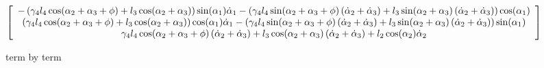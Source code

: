\documentclass{article}
\begin{document}
$\left[ 
\begin{array}{c}
-\left( \gamma _{4}l_{4}\cos (\alpha _{2}+\alpha _{3}+\phi )+l_{3}\cos
(\alpha _{2}+\alpha _{3})\right) \sin (\alpha _{1})\dot{\alpha}_{1}-\left(
\gamma _{4}l_{4}\sin (\alpha _{2}+\alpha _{3}+\phi )\left( \dot{\alpha}_{2}+%
\dot{\alpha}_{3}\right) +l_{3}\sin (\alpha _{2}+\alpha _{3})\left( \dot{%
\alpha}_{2}+\dot{\alpha}_{3}\right) \right) \cos (\alpha _{1}) \\ 
\left( \gamma _{4}l_{4}\cos (\alpha _{2}+\alpha _{3}+\phi )+l_{3}\cos
(\alpha _{2}+\alpha _{3})\right) \cos (\alpha _{1})\dot{\alpha}_{1}-\left(
\gamma _{4}l_{4}\sin (\alpha _{2}+\alpha _{3}+\phi )\left( \dot{\alpha}_{2}+%
\dot{\alpha}_{3}\right) +l_{3}\sin (\alpha _{2}+\alpha _{3})\left( \dot{%
\alpha}_{2}+\dot{\alpha}_{3}\right) \right) \sin (\alpha _{1}) \\ 
\gamma _{4}l_{4}\cos (\alpha _{2}+\alpha _{3}+\phi )\left( \dot{\alpha}_{2}+%
\dot{\alpha}_{3}\right) +l_{3}\cos (\alpha _{2}+\alpha _{3})\left( \dot{%
\alpha}_{2}+\dot{\alpha}_{3}\right) +l_{2}\cos (\alpha _{2})\dot{\alpha}_{2}%
\end{array}%
\right] $

term by term 
\end{document}
